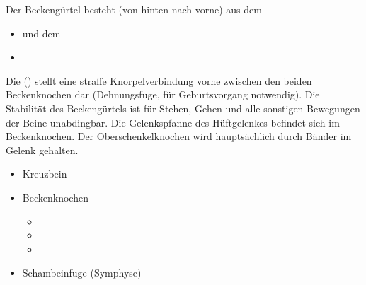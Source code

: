{
Der Beckengürtel besteht (von hinten nach vorne) aus dem
\begin{itemize}
    \item {}  und dem 
    \item {}
\end{itemize}
Die  () stellt eine straffe
Knorpelverbindung vorne zwischen den beiden Beckenknochen
dar (Dehnungsfuge, für Geburtsvorgang notwendig).
Die Stabilität des Beckengürtels ist für Stehen, Gehen und
alle sonstigen Bewegungen der Beine unabdingbar. Die
Gelenkspfanne des Hüftgelenkes befindet sich im
Beckenknochen. Der Oberschenkelknochen wird hauptsächlich
durch Bänder im Gelenk gehalten.



}
{
\begin{itemize}
    \item Kreuzbein 
    \item Beckenknochen
    \begin{itemize}
        \item {}
        \item {}
        \item {}
    \end{itemize}
    \item Schambeinfuge (Symphyse)
\end{itemize}
}
{}{}{}



